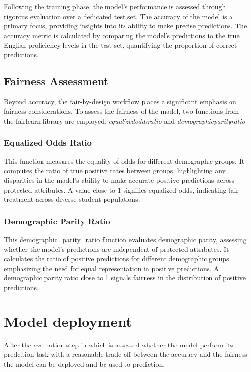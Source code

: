\documentclass[12pt,a4paper,openright,twoside]{book}
\begin{document}
Following the training phase, the model's performance is assessed through rigorous evaluation over a dedicated test set. The accuracy of the model is a primary focus, providing insights into its ability to make precise predictions. The accuracy metric is calculated by comparing the model's predictions to the true English proficiency levels in the test set, quantifying the proportion of correct predictions.

\subsection{Fairness Assessment}

Beyond accuracy, the fair-by-design workflow places a significant emphasis on fairness considerations. To assess the fairness of the model, two functions from the fairlearn library are employed: \emph{equalized\textunderscore odds\textunderscore ratio} and \emph{demographic\textunderscore parity\textunderscore ratio}

\subsubsection{Equalized Odds Ratio}

This function measures the equality of odds for different demographic groups. It computes the ratio of true positive rates between groups, highlighting any disparities in the model's ability to make accurate positive predictions across protected attributes. A value close to 1 signifies equalized odds, indicating fair treatment across diverse student populations.

\subsubsection{Demographic Parity Ratio}

This demographic_parity_ratio function evaluates demographic parity, assessing whether the model's predictions are independent of protected attributes. It calculates the ratio of positive predictions for different demographic groups, emphasizing the need for equal representation in positive predictions. A demographic parity ratio close to 1 signals fairness in the distribution of positive predictions.

\section{Model deployment}
After the evaluation step in which is assessed whether the model perform its predcition task with a reasonable trade-off between the accuracy and the fairness the model can be deployed and be used to prediction.
\end{document}
